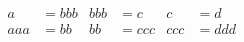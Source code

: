 $
      \begin{alignat}{3}
      a   &= bbb&bbb &=   c&c   &= d \\
      aaa &=  bb&bb  &= ccc&ccc &= ddd
      \end{alignat}
$
